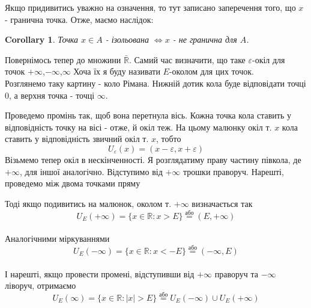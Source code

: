 \documentclass[a4paper, 14pt]{article}
\theoremstyle{theoremdd}
\theoremstyle{theoremdd}
\theoremstyle{theoremdd}
\theoremstyle{theoremdd}
\theoremstyle{theoremdd}
\theoremstyle{theoremdd}
\theoremstyle{theoremdd}
\theoremstyle{theoremdd}
\newtheorem{corollary}[theorem]{Corollary}
\begin{document}
Якщо придивитись уважно на означення, то тут записано заперечення того, що $x$ - гранична точка. Отже, маємо наслідок:
\begin{corollary}
Точка $x \in A$ - ізольована $\iff x$ - не гранична для $A$.
\end{corollary}

Повернімось тепер до множини $\bar{\mathbb{R}}$. Самий час визначити, що таке $\varepsilon$-окіл для точок $+\infty$,$-\infty$,$\infty$ Хоча їх я буду називати $E$-околом для цих точок.\\
Розглянемо таку картину - коло Рімана. Нижній дотик кола буде відповідати точці $0$, а верхня точка - точці $\infty$.
	\begin{figure}[H]
	\centering
	\end{figure}
	Проведемо промінь так, щоб вона перетнула вісь. Кожна точка кола ставить у відповідність точку на вісі - отже, й окіл теж. На цьому малюнку окіл т. $x$ кола ставить у відповідність звичний окіл т. $x$, тобто $$U_{\varepsilon}(x) = (x-\varepsilon,x+\varepsilon)$$
	Візьмемо тепер окіл в нескінченності. Я розглядатиму праву частину півкола, де $+\infty$, для іншої аналогічно. Відступимо від $+\infty$ трошки праворуч. Нарешті, проведемо між двома точками пряму\\
	\begin{figure}[H]
	\centering
	\resizebox{1.1\textwidth}{!} {
	}
	\end{figure}
	Тоді якщо подивитись на малюнок, околом т. $+\infty$ визначається так $$U_{E}(+\infty) = \{x \in \mathbb{R}: x > E\} \overset{\text{або}}{=} (E,+\infty)$$\\
	Аналогічними міркуваннями $$U_{E}(-\infty) = \{x \in \mathbb{R}: x < -E\} \overset{\text{або}}{=} (-\infty, E)$$\\
	І нарешті, якщо провести промені, відступивши від $+\infty$ праворуч та $-\infty$ ліворуч, отримаємо
	$$U_{E}(\infty) = \{x \in \mathbb{R}: |x| > E\} \overset{\text{або}}{=} U_{E}(-\infty) \cup U_E(+\infty) $$
	
\end{document}

